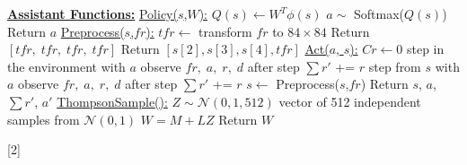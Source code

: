 \documentclass{article}
\begin{document}
\begin{algorithm}
    \begin{algorithmic}[2]
    \State \textbf{\underline{Assistant Functions:}}
    \State
    \State \underline{Policy($s$,$W$):}
        \State $Q(s) \gets W^T \phi(s)$
        \State $a \sim$ Softmax($Q(s)$)
        \State Return $a$
    \State
    \State
    \State \underline{Preprocess($s$,$fr$):}
        \State $tfr \gets$ transform $fr$ to $84\times84$
            \State Return $[tfr,\;tfr,\;tfr,\;tfr]$
        \Else
            \State Return $[s[2],s[3],s[4],tfr]$
        \EndIf
    \State
    \State
    \State \underline{Act($a$, $s$):}
        \State $Cr \gets 0$
                \State step in the environment with $a$
                \State observe $fr,\;a,\;r,\;d$ after step
                \State $\sum{r'}$ += $r$
            \EndFor
            \State step from $s$ with $a$
            \State observe $fr,\;a,\;r,\;d$ after step
            \State $\sum{r'}$ += $r$
        \EndIf
    \State
    \State
        \State $s \gets$ Preprocess($s$,$fr$)
        \State Return $s$, $a$, $\sum{r'}$, $a'$
    \State
    \State
    \State \underline{ThompsonSample():}
        \State $Z \sim \mathcal{N}(0,1,512)$ vector of 512 independent samples from $\mathcal{N}(0,1)$ 
        \State $W = M + LZ$
        \State Return $W$
        \end{algorithmic}[2]
\end{algorithm}
\end{document}
